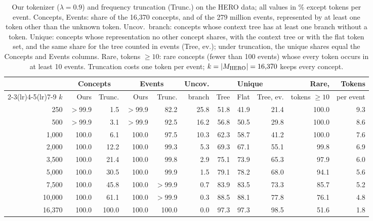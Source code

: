 \begin{table}[t]
\centering
\small
\setlength{\tabcolsep}{3.5pt}
\begin{tabular}{@{}r rr rr r rrr r r@{}}
\toprule
 & \multicolumn{2}{c}{Concepts} & \multicolumn{2}{c}{Events} & Uncov. & \multicolumn{3}{c}{Unique} & Rare, & Tokens \\
\cmidrule(lr){2-3}\cmidrule(lr){4-5}\cmidrule(lr){7-9}
$k$ & Ours & Trunc. & Ours & Trunc. & branch & Tree & Flat & Tree, ev. & tokens $\ge 10$ & per event \\
\midrule
250 & $>$99.9 & 1.5 & $>$99.9 & 82.2 & 25.8 & 51.8 & 41.9 & 21.4 & 100.0 & 9.3 \\
500 & $>$99.9 & 3.1 & $>$99.9 & 92.5 & 16.2 & 56.8 & 50.5 & 29.8 & 100.0 & 8.6 \\
1,000 & 100.0 & 6.1 & 100.0 & 97.5 & 10.3 & 62.3 & 58.7 & 41.2 & 100.0 & 7.6 \\
2,000 & 100.0 & 12.2 & 100.0 & 99.3 & 5.3 & 69.3 & 67.1 & 55.1 & 99.8 & 6.9 \\
3,500 & 100.0 & 21.4 & 100.0 & 99.8 & 2.9 & 75.1 & 73.9 & 65.3 & 97.9 & 6.0 \\
5,000 & 100.0 & 30.5 & 100.0 & 99.9 & 1.5 & 79.1 & 78.2 & 68.0 & 94.1 & 5.6 \\
7,500 & 100.0 & 45.8 & 100.0 & $>$99.9 & 0.7 & 83.9 & 83.5 & 73.3 & 85.7 & 5.2 \\
10,000 & 100.0 & 61.1 & 100.0 & $>$99.9 & 0.3 & 88.5 & 88.1 & 77.8 & 76.1 & 4.8 \\
16,370 & 100.0 & 100.0 & 100.0 & 100.0 & 0.0 & 97.3 & 97.3 & 98.5 & 51.6 & 1.8 \\
\bottomrule
\end{tabular}
\caption{Our tokenizer ($\lambda = 0.9$) and frequency truncation (Trunc.) on the HERO data; all values in \% except tokens per event.
Concepts, Events: share of the 16,370 concepts, and of the 279 million events, represented by at least one token other than the unknown token.
Uncov.\ branch: concepts whose context tree has at least one branch without a token.
Unique: concepts whose representation no other concept shares, with the context tree or with the flat token set, and the same share for the tree counted in events (Tree, ev.); under truncation, the unique shares equal the Concepts and Events columns.
Rare, tokens $\ge 10$: rare concepts (fewer than 100 events) whose every token occurs in at least 10 events.
Truncation costs one token per event; $k = |M_{\mathrm{HERO}}| = 16{,}370$ keeps every concept.}
\label{tab:ehr}
\end{table}

